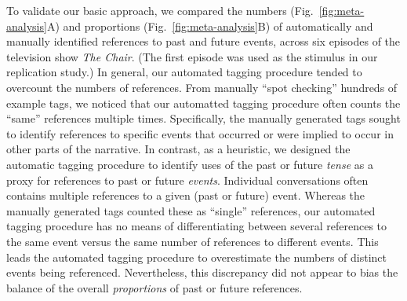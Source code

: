 \documentclass[10pt]{article}
\begin{document}
To validate our basic approach, we compared the numbers (Fig.~\ref{fig:meta-analysis}A) and proportions (Fig.~\ref{fig:meta-analysis}B) of automatically and manually identified references to past and future events, across six episodes of the television show \textit{The Chair}. (The first episode was used as the stimulus in our replication study.) In general, our automated tagging procedure tended to overcount the numbers of references. From manually ``spot checking'' hundreds of example tags, we noticed that our automatted tagging procedure often counts the ``same'' references multiple times. Specifically, the manually generated tags sought to identify references to specific events that occurred or were implied to occur in other parts of the narrative. In contrast, as a heuristic, we designed the automatic tagging procedure to identify uses of the past or future \textit{tense} as a proxy for references to past or future \textit{events}. Individual conversations often contains multiple references to a given (past or future) event. Whereas the manually generated tags counted these as ``single'' references, our automated tagging procedure has no means of differentiating between several references to the same event versus the same number of references to different events. This leads the automated tagging procedure to overestimate the numbers of distinct events being referenced. Nevertheless, this discrepancy did not appear to bias the balance of the overall \textit{proportions} of past or future references.
\end{document}
